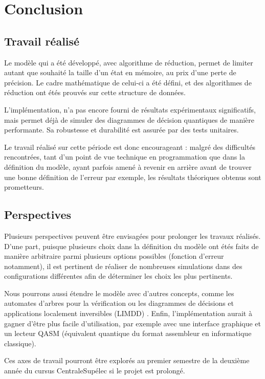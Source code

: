 
\chapter{Conclusion} %
\label{ch:Conclusion}

\section{Travail réalisé}

Le modèle qui a été développé, avec algorithme de réduction, permet de limiter autant que souhaité la taille d'un état en mémoire, au prix d'une perte de précision. Le cadre mathématique de celui-ci a été défini, et des algorithmes de réduction ont étés prouvés sur cette structure de données.

L'implémentation, n'a pas encore fourni de résultats expérimentaux significatifs, mais permet déjà de simuler des diagrammes de décision quantiques de manière performante. Sa robustesse et durabilité est assurée par des tests unitaires.

Le travail réalisé sur cette période est donc encourageant : malgré des difficultés rencontrées, tant d'un point de vue technique en programmation que dans la définition du modèle, ayant parfois amené à revenir en arrière avant de trouver une bonne définition de l'erreur par exemple, les résultats théoriques obtenus sont prometteurs.

\section{Perspectives}

Plusieurs perspectives peuvent être envisagées pour prolonger les travaux réalisés. D'une part, puisque plusieurs choix dans la définition du modèle ont étés faits de manière arbitraire parmi plusieurs options possibles (fonction d'erreur notamment), il est pertinent de réaliser de nombreuses simulations dans des configurations différentes afin de déterminer les choix les plus pertinents.

Nous pourrons aussi étendre le modèle avec d'autres concepts, comme les automates d'arbres pour la vérification \cite{Chen_2023} ou les diagrammes de décisions et applications localement inversibles (LIMDD) \cite{Vinkhuijzen_2023}. Enfin, l'implémentation aurait à gagner d'être plus facile d'utilisation, par exemple avec une interface graphique et un lecteur QASM (équivalent quantique du format assembleur en informatique classique).

Ces axes de travail pourront être explorés au premier semestre de la deuxième année du cursus CentraleSupélec si le projet est prolongé.